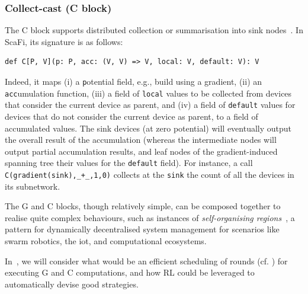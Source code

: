 \subsubsection{Collect-cast (C block)}
%
The C block supports distributed collection or summarisation into sink nodes~\cite{DBLP:journals/cee/AudritoCDPV21}.
%
In ScaFi, its signature is as follows:
\begin{lstlisting}
def C[P, V](p: P, acc: (V, V) => V, local: V, default: V): V
\end{lstlisting}
Indeed, it maps 
 (i) a \lstinline|p|otential field, e.g., build using a gradient,
 (ii) %
 an \lstinline|acc|umulation function,
 (iii) a field of \lstinline|local| values to be collected from devices that consider the current device as parent,
 and
 (iv) a field of \lstinline|default| values for devices that do not consider the current device as parent,
 to a field of accumulated values.
%
The sink devices (at zero potential)
 will eventually output the overall result of the accumulation (whereas the intermediate nodes will output partial accumulation results, and leaf nodes of the gradient-induced spanning tree their values for the \lstinline|default| field).
%
For instance, a call 
 \lstinline|C(gradient(sink),_+_,1,0)|
 collects at the \lstinline|sink| the count of all the devices in its subnetwork.


The G and C blocks, though relatively simple,
 can be composed together to 
 realise quite complex behaviours,
 such as instances
 of \emph{self-organising regions}~\cite{DBLP:journals/fgcs/PianiniCVN21},
 a pattern for dynamically decentralised %
  system management 
 for scenarios
 like swarm robotics, the \ac{iot}, 
 and computational ecosystems.
%

In~,
 we will consider
 what would be an efficient scheduling of rounds
 (cf. )
 for executing G and C computations,
 and how \ac{RL} could 
 be leveraged to automatically devise good strategies.

